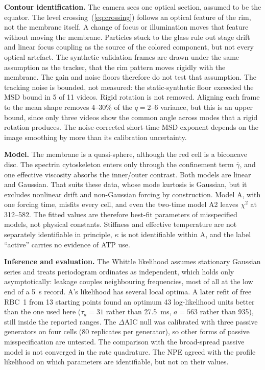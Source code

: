 \documentclass[conference]{IEEEtran}
\begin{document}
\textbf{Contour identification.} The camera sees one optical section, assumed to be the equator. The
level crossing~(\ref{eq:crossing}) follows an optical feature of the rim, not the membrane itself. A
change of focus or illumination moves that feature without moving the membrane. Particles stuck to
the glass rule out stage drift and linear focus coupling as the source of the colored component, but
not every optical artefact. The synthetic validation frames are drawn under the same assumption as
the tracker, that the rim pattern moves rigidly with the membrane. The gain and noise floors
therefore do not test that assumption. The tracking noise is bounded, not measured: the
static-synthetic floor exceeded the MSD bound in 5 of 11 videos. Rigid rotation is not removed.
Aligning each frame to the mean shape removes 4--30\% of the $q = 2$--6 variance, but this is an
upper bound, since only three videos show the common angle across modes that a rigid rotation
produces. The noise-corrected short-time MSD exponent depends on the image smoothing by more than
its calibration uncertainty.

\textbf{Model.} The membrane is a quasi-sphere, although the red cell is a biconcave disc. The
spectrin cytoskeleton enters only through the confinement term $\bar\gamma$, and one effective
viscosity absorbs the inner/outer contrast. Both models are linear and Gaussian. That suits these
data, whose mode kurtosis is Gaussian, but it excludes nonlinear drift and non-Gaussian forcing by
construction. Model A, with one forcing time, misfits every cell, and even the two-time model A2
leaves $\chi^2$ at 312--582. The fitted values are therefore best-fit parameters of misspecified
models, not physical constants. Stiffness and effective temperature are not separately identifiable
in principle, $\kappa$ is not identifiable within A, and the label ``active'' carries no evidence of
ATP use.

\textbf{Inference and evaluation.} The Whittle likelihood assumes stationary Gaussian series and
treats periodogram ordinates as independent, which holds only asymptotically: leakage couples
neighbouring frequencies, most of all at the low end of a 5~s record. A's likelihood has several
local optima. A later refit of free RBC~1 from 13 starting points found an optimum 43 log-likelihood
units better than the one used here ($\tau_a = 31$ rather than 27.5~ms, $a = 563$ rather than 935),
still inside the reported ranges. The $\Delta$AIC null was calibrated with three passive generators
on four cells (80 replicates per generator), so other forms of passive misspecification are untested.
The comparison with the broad-spread passive model is not converged in the rate quadrature. The NPE
agreed with the profile likelihood on which parameters are identifiable, but not on their values.
\end{document}
